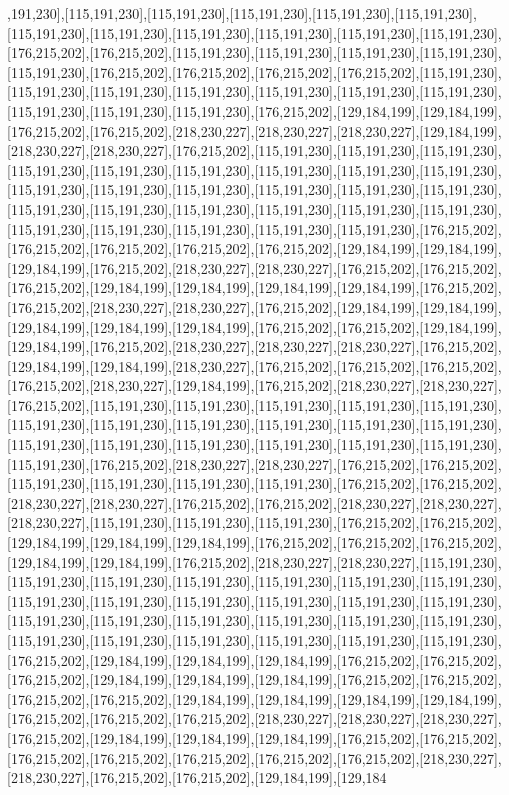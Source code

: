 ,191,230],[115,191,230],[115,191,230],[115,191,230],[115,191,230],[115,191,230],[115,191,230],[115,191,230],[115,191,230],[115,191,230],[115,191,230],[115,191,230],[176,215,202],[176,215,202],[115,191,230],[115,191,230],[115,191,230],[115,191,230],[115,191,230],[176,215,202],[176,215,202],[176,215,202],[176,215,202],[115,191,230],[115,191,230],[115,191,230],[115,191,230],[115,191,230],[115,191,230],[115,191,230],[115,191,230],[115,191,230],[115,191,230],[176,215,202],[129,184,199],[129,184,199],[176,215,202],[176,215,202],[218,230,227],[218,230,227],[218,230,227],[129,184,199],[218,230,227],[218,230,227],[176,215,202],[115,191,230],[115,191,230],[115,191,230],[115,191,230],[115,191,230],[115,191,230],[115,191,230],[115,191,230],[115,191,230],[115,191,230],[115,191,230],[115,191,230],[115,191,230],[115,191,230],[115,191,230],[115,191,230],[115,191,230],[115,191,230],[115,191,230],[115,191,230],[115,191,230],[115,191,230],[115,191,230],[115,191,230],[115,191,230],[115,191,230],[176,215,202],[176,215,202],[176,215,202],[176,215,202],[176,215,202],[129,184,199],[129,184,199],[129,184,199],[176,215,202],[218,230,227],[218,230,227],[176,215,202],[176,215,202],[176,215,202],[129,184,199],[129,184,199],[129,184,199],[129,184,199],[176,215,202],[176,215,202],[218,230,227],[218,230,227],[176,215,202],[129,184,199],[129,184,199],[129,184,199],[129,184,199],[129,184,199],[176,215,202],[176,215,202],[129,184,199],[129,184,199],[176,215,202],[218,230,227],[218,230,227],[218,230,227],[176,215,202],[129,184,199],[129,184,199],[218,230,227],[176,215,202],[176,215,202],[176,215,202],[176,215,202],[218,230,227],[129,184,199],[176,215,202],[218,230,227],[218,230,227],[176,215,202],[115,191,230],[115,191,230],[115,191,230],[115,191,230],[115,191,230],[115,191,230],[115,191,230],[115,191,230],[115,191,230],[115,191,230],[115,191,230],[115,191,230],[115,191,230],[115,191,230],[115,191,230],[115,191,230],[115,191,230],[115,191,230],[176,215,202],[218,230,227],[218,230,227],[176,215,202],[176,215,202],[115,191,230],[115,191,230],[115,191,230],[115,191,230],[176,215,202],[176,215,202],[218,230,227],[218,230,227],[176,215,202],[176,215,202],[218,230,227],[218,230,227],[218,230,227],[115,191,230],[115,191,230],[115,191,230],[176,215,202],[176,215,202],[129,184,199],[129,184,199],[129,184,199],[176,215,202],[176,215,202],[176,215,202],[129,184,199],[129,184,199],[176,215,202],[218,230,227],[218,230,227],[115,191,230],[115,191,230],[115,191,230],[115,191,230],[115,191,230],[115,191,230],[115,191,230],[115,191,230],[115,191,230],[115,191,230],[115,191,230],[115,191,230],[115,191,230],[115,191,230],[115,191,230],[115,191,230],[115,191,230],[115,191,230],[115,191,230],[115,191,230],[115,191,230],[115,191,230],[115,191,230],[115,191,230],[115,191,230],[176,215,202],[129,184,199],[129,184,199],[129,184,199],[176,215,202],[176,215,202],[176,215,202],[129,184,199],[129,184,199],[129,184,199],[176,215,202],[176,215,202],[176,215,202],[176,215,202],[129,184,199],[129,184,199],[129,184,199],[129,184,199],[176,215,202],[176,215,202],[176,215,202],[218,230,227],[218,230,227],[218,230,227],[176,215,202],[129,184,199],[129,184,199],[129,184,199],[176,215,202],[176,215,202],[176,215,202],[176,215,202],[176,215,202],[176,215,202],[176,215,202],[218,230,227],[218,230,227],[176,215,202],[176,215,202],[129,184,199],[129,184
